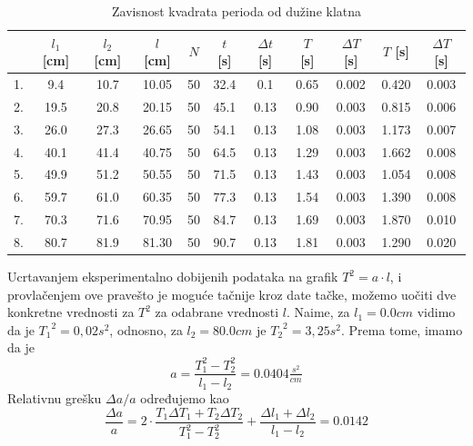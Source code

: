 \documentclass[a4paper]{article}
\begin{document}
\begin{table}[h!]
    \centering
    \begin{tabular}{|c|c|c|c|c|c|c|c|c|c|c|}
      \hline
         & $l_1$ [cm] & $l_2$ [cm] & $l$ [cm] & $N$ & $t$ [s] & $\Delta t$ [s] & $T$ [s] & $\Delta T$ [s] & $T$ [s] & $\Delta T$ [s] \\ \hline
      1. & 9.4        & 10.7       & 10.05    & 50 & 32.4     & 0.1            & 0.65    & 0.002 & 0.420  & 0.003 \\ \hline
      2. & 19.5       & 20.8       & 20.15    & 50 & 45.1     & 0.13           & 0.90    & 0.003 & 0.815  & 0.006 \\ \hline
      3. & 26.0       & 27.3       & 26.65    & 50 & 54.1     & 0.13           & 1.08    & 0.003 & 1.173  & 0.007 \\ \hline
      4. & 40.1       & 41.4       & 40.75    & 50 & 64.5     & 0.13           & 1.29    & 0.003 & 1.662  & 0.008 \\ \hline
      5. & 49.9       & 51.2       & 50.55    & 50 & 71.5     & 0.13           & 1.43    & 0.003 & 1.054  & 0.008 \\ \hline
      6. & 59.7       & 61.0       & 60.35    & 50 & 77.3     & 0.13           & 1.54    & 0.003 & 1.390  & 0.008 \\ \hline
      7. & 70.3       & 71.6       & 70.95    & 50 & 84.7     & 0.13           & 1.69    & 0.003 & 1.870  & 0.010 \\ \hline
      8. & 80.7       & 81.9       & 81.30    & 50 & 90.7     & 0.13           & 1.81    & 0.003 & 1.290  & 0.020 \\ \hline
    \end{tabular}
    \label{tab:rezulatati}
    \caption{Zavisnost kvadrata perioda od dužine klatna}
\end{table}

Ucrtavanjem eksperimentalno dobijenih podataka na grafik $T^2 = a \cdot l$, i provlačenjem ove pravešto je moguće tačnije kroz date tačke, možemo uočiti dve konkretne vrednosti za $T^2$ za odabrane vrednosti $l$. Naime, za $l_1 = 0.0 cm$ vidimo da je ${T_1}^2 = 0,02s^2$, odnosno, za $l_2 = 80.0 cm$ je ${T_2}^2 = 3,25s^2$. Prema tome, imamo da je
\begin{equation}
    a = \frac{T_1^2 - T_2^2}{l_1 - l_2} = 0.0404 \tfrac{s^2}{cm}
\end{equation}
Relativnu grešku $\Delta a / a$ određujemo kao
\begin{equation}
    \frac{\Delta a}{a} = 2 \cdot \frac{T_1 \Delta T_1 + T_2 \Delta T_2}{T_1^2 - T_2^2} + \frac{\Delta l_1 + \Delta l_2}{l_1 - l_2} = 0.0142
\end{equation}
\end{document}
